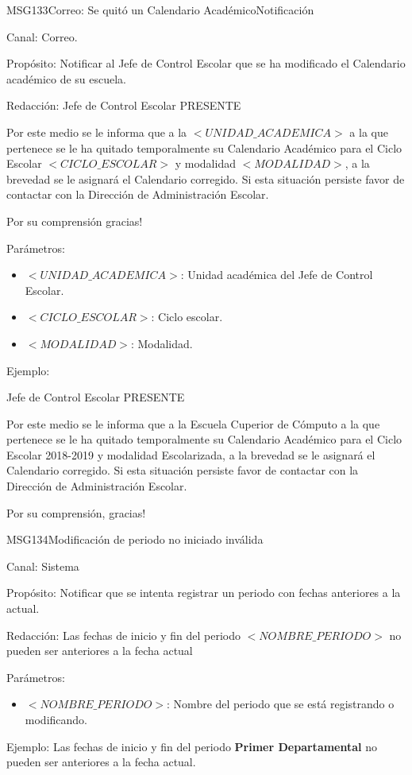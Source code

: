 \begin{mensaje}{MSG133}{Correo: Se quitó un Calendario Académico}{Notificación}
	\item[Canal:] Correo.
	\item[Propósito:] Notificar al Jefe de Control Escolar que se ha modificado el Calendario académico de su escuela.
	\item[Redacción:] \cdtEmpty
	Jefe de Control Escolar
	PRESENTE
 
	Por este medio se le informa que a la $<UNIDAD\_ACADEMICA>$ a la que pertenece se le ha quitado temporalmente su Calendario Académico para el Ciclo Escolar $<CICLO\_ESCOLAR>$ y modalidad $<MODALIDAD>$, a la brevedad se le asignará el Calendario corregido. Si esta situación persiste favor de contactar con la Dirección de Administración Escolar.

Por su comprensión gracias! 
	\item[Parámetros:] \cdtEmpty 	
		\begin{itemize}
			\item $<UNIDAD\_ACADEMICA>$: Unidad académica del Jefe de Control Escolar.
			\item $<CICLO\_ESCOLAR>$: Ciclo escolar.
			\item $<MODALIDAD>$: Modalidad.
		\end{itemize}
	\item[Ejemplo:] \cdtEmpty
	
	Jefe de Control Escolar
	PRESENTE
 
	Por este medio se le informa que a la Escuela Cuperior de Cómputo a la que pertenece se le ha quitado temporalmente su Calendario Académico para el Ciclo Escolar 2018-2019 y modalidad Escolarizada, a la brevedad se le asignará el Calendario corregido. Si esta situación persiste favor de contactar con la Dirección de Administración Escolar.


Por su comprensión, gracias!

\end{mensaje}


\begin{mensaje}{MSG134}{Modificación de periodo no iniciado inválida}
	\item[Canal:] Sistema
	\item[Propósito:] Notificar que se intenta registrar un periodo con fechas anteriores a la actual.
	\item[Redacción:] Las fechas de inicio y fin del periodo $<NOMBRE\_PERIODO>$ no pueden ser anteriores a la fecha actual
	\item[Parámetros:] \cdtEmpty 	
		\begin{itemize}
			\item $<NOMBRE\_PERIODO>$: Nombre del periodo que se está registrando o modificando.
		\end{itemize}
	\item[Ejemplo:] Las fechas de inicio y fin del periodo {\bf Primer Departamental} no pueden ser anteriores a la fecha actual.
\end{mensaje}


